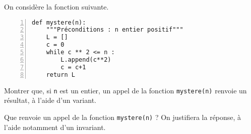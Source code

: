 On considère la fonction suivante.
\begin{Verbatim}[gobble=0,numbers=left]
def mystere(n):
    """Préconditions : n entier positif"""
    L = []
    c = 0 
    while c ** 2 <= n : 
        L.append(c**2)
        c = c+1
    return L
\end{Verbatim}

\bigskip{}

\question{} Montrer que, si \texttt{n} est un entier, un  appel de la fonction \texttt{mystere(n)} renvoie un résultat, à l'aide d'un variant. 

\medskip{}

\question{} Que renvoie un appel de la fonction \texttt{mystere(n)} ? On justifiera la réponse, à l'aide notamment d'un invariant. 